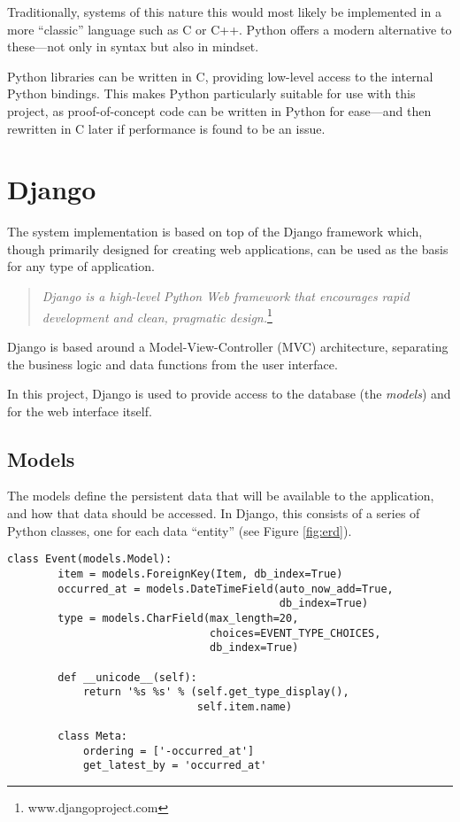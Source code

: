 Traditionally, systems of this nature this would most likely be implemented in
a more ``classic'' language such as C or C++. Python offers a modern
alternative to these---not only in syntax but also in mindset.

Python libraries can be written in C, providing low-level access to
the internal Python bindings. This makes Python particularly suitable for use
with this project, as proof-of-concept code can be written in Python for
ease---and then rewritten in C later if performance is found to be an issue.

\section{Django}

The system implementation is based on top of the Django framework which, though
primarily designed for creating web applications, can be used as the basis for
any type of application.

\begin{quote}
    \emph{Django is a high-level Python Web framework that encourages rapid
    development and clean, pragmatic design.}\footnote{www.djangoproject.com}
\end{quote}

Django is based around a Model-View-Controller (MVC) architecture, separating
the business logic and data functions from the user interface.

In this project, Django is used to provide access to the database (the
\emph{models}) and for the web interface itself.

\subsection{Models}

The models define the persistent data that will be available to the
application, and how that data should be accessed. In Django, this consists of
a series of Python classes, one for each data ``entity'' (see Figure
\ref{fig:erd}).

\begin{singlespacing}
\begin{lstlisting}[caption=The `Event' model, label=lst:event-model]
    class Event(models.Model):
        item = models.ForeignKey(Item, db_index=True)
        occurred_at = models.DateTimeField(auto_now_add=True,
                                           db_index=True)
        type = models.CharField(max_length=20,
                                choices=EVENT_TYPE_CHOICES,
                                db_index=True)

        def __unicode__(self):
            return '%s %s' % (self.get_type_display(),
                              self.item.name)

        class Meta:
            ordering = ['-occurred_at']
            get_latest_by = 'occurred_at'
\end{lstlisting}
\end{singlespacing}

